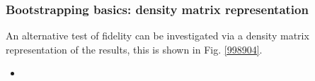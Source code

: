 \subsubsection{Bootstrapping basics: density matrix representation}

An alternative test of fidelity can be investigated via a density matrix representation of the results, this is shown in Fig. \ref{998904}.

\begin{itemize}
\item 
\end{itemize}